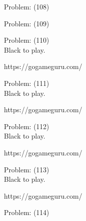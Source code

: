 \documentclass[11pt]{article}
\begin{document}
\begin{minipage}[t]{0.5\textwidth}
  {\centering
  
Problem: (108)\\
  }
\end{minipage}
\begin{minipage}[t]{0.5\textwidth}
  {\centering
  
Problem: (109)\\
  }
\end{minipage}
\begin{minipage}[t]{0.5\textwidth}
  {\centering
  
Problem: (110)\\
Black to play.

https://gogameguru.com/\\
  }
\end{minipage}
\begin{minipage}[t]{0.5\textwidth}
  {\centering
  
Problem: (111)\\
Black to play.

https://gogameguru.com/\\
  }
\end{minipage}
\begin{minipage}[t]{0.5\textwidth}
  {\centering
  
Problem: (112)\\
Black to play.

https://gogameguru.com/\\
  }
\end{minipage}
\begin{minipage}[t]{0.5\textwidth}
  {\centering
  
Problem: (113)\\
Black to play.

https://gogameguru.com/\\
  }
\end{minipage}
\begin{minipage}[t]{0.5\textwidth}
  {\centering
  
Problem: (114)\\
  }
\end{minipage}
\end{document}

